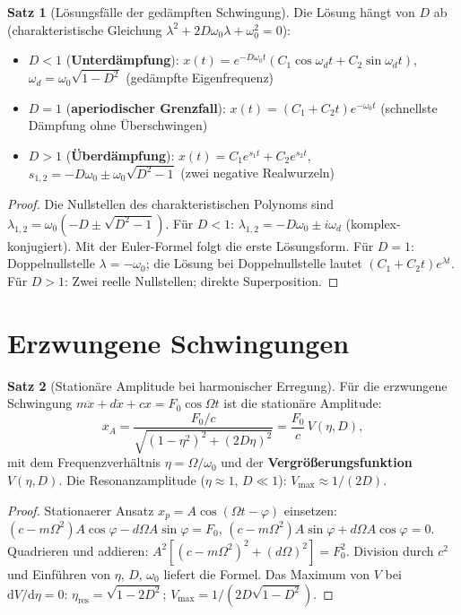 ﻿\documentclass[a4paper,12pt]{report}
\theoremstyle{definition}
\newtheorem{satz}{Satz}
\begin{document}
\begin{satz}[L\"osungsf\"alle der ged\"ampften Schwingung]
Die L\"osung h\"angt von $D$ ab (charakteristische Gleichung $\lambda^2 + 2D\omega_0\lambda + \omega_0^2 = 0$):
\begin{itemize}
    \item[-] $D < 1$ (\textbf{Unterd\"ampfung}):
          $x(t) = e^{-D\omega_0 t}(C_1\cos\omega_d t + C_2\sin\omega_d t)$,
          $\omega_d = \omega_0\sqrt{1-D^2}$ (ged\"ampfte Eigenfrequenz)
    \item[-] $D = 1$ (\textbf{aperiodischer Grenzfall}):
          $x(t) = (C_1 + C_2 t)e^{-\omega_0 t}$ (schnellste D\"ampfung ohne \"Uberschwingen)
    \item[-] $D > 1$ (\textbf{\"Uberd\"ampfung}):
          $x(t) = C_1 e^{s_1 t} + C_2 e^{s_2 t}$,
          $s_{1,2} = -D\omega_0 \pm \omega_0\sqrt{D^2-1}$ (zwei negative Realwurzeln)
\end{itemize}
\end{satz}
\begin{proof}
Die Nullstellen des charakteristischen Polynoms sind
$\lambda_{1,2} = \omega_0(-D \pm \sqrt{D^2-1})$.
F\"ur $D < 1$: $\lambda_{1,2} = -D\omega_0 \pm i\omega_d$ (komplex-konjugiert).
Mit der Euler-Formel folgt die erste L\"osungsform.
F\"ur $D = 1$: Doppelnullstelle $\lambda = -\omega_0$; die L\"osung bei
Doppelnullstelle lautet $(C_1 + C_2 t)e^{\lambda t}$.
F\"ur $D > 1$: Zwei reelle Nullstellen; direkte Superposition.
\end{proof}

\section{Erzwungene Schwingungen}

\begin{satz}[Station\"are Amplitude bei harmonischer Erregung]
F\"ur die erzwungene Schwingung $m\ddot{x} + d\dot{x} + cx = F_0\cos\Omega t$
ist die station\"are Amplitude:
\[
  x_A = \frac{F_0/c}{\sqrt{(1-\eta^2)^2 + (2D\eta)^2}} = \frac{F_0}{c}\,V(\eta,D),
\]
mit dem Frequenzverh\"altnis $\eta = \Omega/\omega_0$ und der
\textbf{Vergr\"o\ss{}erungsfunktion} $V(\eta, D)$.
Die Resonanzamplitude ($\eta \approx 1$, $D \ll 1$): $V_{\max} \approx 1/(2D)$.
\end{satz}
\begin{proof}
Stationaerer Ansatz $x_p = A\cos(\Omega t - \varphi)$ einsetzen:
$(c - m\Omega^2)A\cos\varphi - d\Omega A\sin\varphi = F_0$,
$(c - m\Omega^2)A\sin\varphi + d\Omega A\cos\varphi = 0$.
Quadrieren und addieren: $A^2[(c-m\Omega^2)^2 + (d\Omega)^2] = F_0^2$.
Division durch $c^2$ und Einf\"uhren von $\eta$, $D$, $\omega_0$ liefert die Formel.
Das Maximum von $V$ bei $\mathrm{d}V/\mathrm{d}\eta = 0$:
$\eta_{\text{res}} = \sqrt{1-2D^2}$; $V_{\max} = 1/(2D\sqrt{1-D^2})$.
\end{proof}
\end{document}
